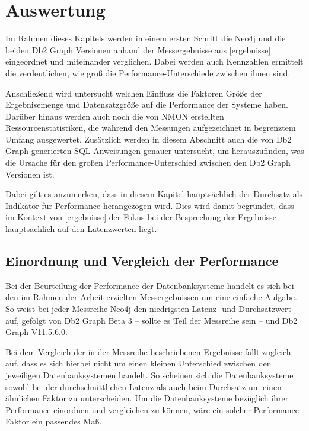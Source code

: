 \chapter{Auswertung}
\label{auswertung}
Im Rahmen dieses Kapitels werden in einem ersten Schritt die Neo4j und die beiden Db2 Graph Versionen anhand der Messergebnisse aus \autoref{ergebnisse} eingeordnet und miteinander verglichen. Dabei werden auch Kennzahlen ermittelt die verdeutlichen, wie groß die Performance-Unterschiede zwischen ihnen sind. 

Anschließend wird untersucht welchen Einfluss die Faktoren Größe der Ergebnisemenge und Datensatzgröße auf die Performance der Systeme haben. Darüber hinaus werden auch noch die von NMON erstellten Ressourcenstatistiken, die während den Messungen aufgezeichnet in begrenztem Umfang ausgewertet. Zusätzlich werden in diesem Abschnitt auch die von Db2 Graph generierten SQL-Anweisungen genauer untersucht, um herauszufinden, was die Ursache für den großen Performance-Unterschied zwischen den Db2 Graph Versionen ist.

Dabei gilt es anzumerken, dass in diesem Kapitel hauptsächlich der Durchsatz als Indikator für Performance herangezogen wird. Dies wird damit begründet, dass im Kontext von \autoref{ergebnisse} der Fokus bei der Besprechung der Ergebnisse hauptsächlich auf den Latenzwerten liegt.


\section{Einordnung und Vergleich der Performance}
\label{auswertung:einordnung}
Bei der Beurteilung der Performance der Datenbanksysteme handelt es sich bei den im Rahmen der Arbeit erzielten Messergebnissen um eine einfache Aufgabe. So weist bei jeder Messreihe Neo4j den niedrigsten Latenz- und Durchsatzwert auf, gefolgt von Db2 Graph Beta 3 -- sollte es Teil der Messreihe sein -- und Db2 Graph V11.5.6.0. 

Bei dem Vergleich der in der Messreihe beschriebenen Ergebnisse fällt zugleich auf, dass es sich hierbei nicht um einen kleinen Unterschied zwischen den jeweiligen Datenbanksystemen handelt. So scheinen sich die Datenbanksysteme sowohl bei der durchschnittlichen Latenz als auch beim Durchsatz um einen ähnlichen Faktor zu unterscheiden. Um die Datenbanksysteme bezüglich ihrer Performance einordnen und vergleichen zu können, wäre ein solcher Performance-Faktor ein passendes Maß. 

